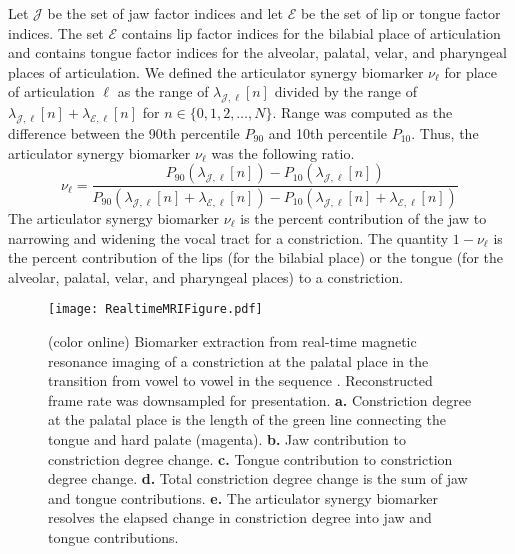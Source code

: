 \documentclass[preprint]{JASAnew}
\begin{document}
Let $\mathcal{J}$ be the set of jaw factor indices and let $\mathcal{E}$ be the set of lip or tongue factor indices. The set $\mathcal{E}$ contains lip factor indices for the bilabial place of articulation and contains tongue factor indices for the alveolar, palatal, velar, and pharyngeal places of articulation. 
%
We defined the articulator synergy biomarker $\nu_\ell$ for place of articulation $\ell$ as the range of $\lambda_{\mathcal{J},\ell} [ n ]$ divided by the range of $\lambda_{\mathcal{J},\ell} [ n ] + \lambda_{\mathcal{E},\ell} [ n ]$
for $n \in \{0, 1, 2, \ldots, N\}$.
%
Range was computed as the difference between the 90th percentile $P_{90}$ and 10th percentile $P_{10}$. 
%
Thus, the articulator synergy biomarker $\nu_\ell$ was the following ratio.
\begin{equation}
\nu_\ell
=
\frac{P_{90}\left( \lambda_{\mathcal{J},\ell} [n] \right) - P_{10}\left( \lambda_{\mathcal{J},\ell} [n] \right)}
{P_{90}\left( \lambda_{\mathcal{J},\ell} [n] + \lambda_{\mathcal{E},\ell} [n] \right) - P_{10}\left( \lambda_{\mathcal{J},\ell} [n] + \lambda_{\mathcal{E},\ell} [n]\right)}
\end{equation}
%
The articulator synergy biomarker $\nu_\ell$ is the percent contribution of the jaw to narrowing and widening the vocal tract for a constriction. 
%
The quantity $1-\nu_\ell$ is the percent contribution of the lips (for the bilabial place) or the tongue (for the alveolar, palatal, velar, and pharyngeal places) to a constriction. 


\begin{figure}

\texttt{[image: RealtimeMRIFigure.pdf]}

\caption{(color online) Biomarker extraction from real-time magnetic resonance imaging of a constriction at the palatal place in the transition from vowel \textipa{[a]} to vowel \textipa{[j]} in the sequence \textipa{[aja]}. Reconstructed frame rate was downsampled for presentation. 
\textbf{a.} Constriction degree at the palatal place is the length of the green line connecting the tongue and hard palate (magenta). 
\textbf{b.} Jaw contribution to constriction degree change.
\textbf{c.} Tongue contribution to constriction degree change.
\textbf{d.} Total constriction degree change is the sum of jaw and tongue contributions.
\textbf{e.} The articulator synergy biomarker resolves the elapsed change in constriction degree into jaw and tongue contributions.}
\label{fig:realtimeMRI}%
\end{figure}
\end{document}
